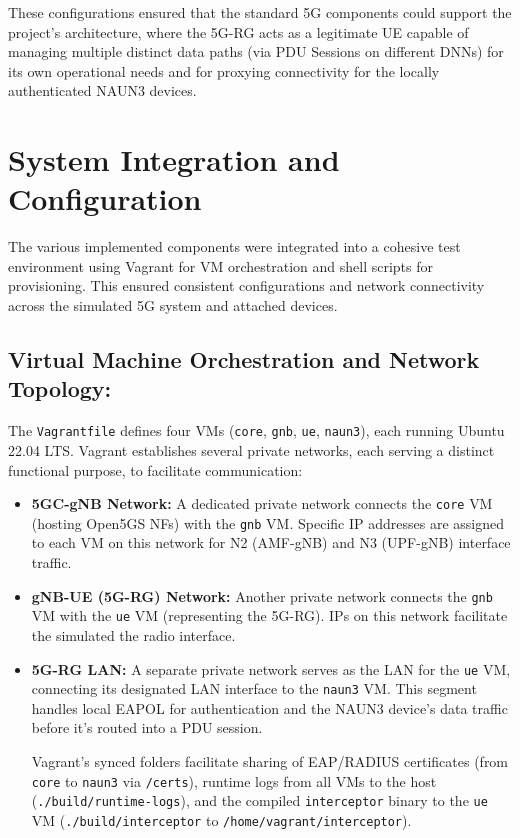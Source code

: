 These configurations ensured that the standard \ac{5G} components could support the project's architecture, where the \ac{5G-RG} acts as a legitimate \ac{UE} capable of managing multiple distinct data paths (via \ac{PDU} Sessions on different \acp{DNN}) for its own operational needs and for proxying connectivity for the locally authenticated \ac{NAUN3} devices.

\section{System Integration and Configuration}

The various implemented components were integrated into a cohesive test environment using Vagrant for \ac{VM} orchestration and shell scripts for provisioning. This ensured consistent configurations and network connectivity across the simulated \ac{5G} system and attached devices.

\subsection{Virtual Machine Orchestration and Network Topology:}

The \texttt{Vagrantfile} defines four \acp{VM} (\texttt{core}, \texttt{gnb}, \texttt{ue}, \texttt{naun3}), each running Ubuntu 22.04 LTS. Vagrant establishes several private networks, each serving a distinct functional purpose, to facilitate communication:

\begin{itemize}
    \item \textbf{\ac{5GC}-\ac{gNB} Network:} A dedicated private network connects the \texttt{core} \ac{VM} (hosting Open5GS \acp{NF}) with the \texttt{gnb} \ac{VM}. Specific \ac{IP} addresses are assigned to each \ac{VM} on this network for N2 (\ac{AMF}-\ac{gNB}) and N3 (\ac{UPF}-\ac{gNB}) interface traffic.

    \item \textbf{\ac{gNB}-\ac{UE} (\ac{5G}-\ac{RG}) Network:} Another private network connects the \texttt{gnb} \ac{VM} with the \texttt{ue} \ac{VM} (representing the \ac{5G-RG}). \acp{IP} on this network facilitate the simulated the radio interface.

    \item{ 
        \textbf{\ac{5G-RG} \ac{LAN}:} A separate private network serves as the \ac{LAN} for the \texttt{ue} \ac{VM}, connecting its designated \ac{LAN} interface to the \texttt{naun3} \ac{VM}. This segment handles local \ac{EAPOL} for authentication and the \ac{NAUN3} device's data traffic before it's routed into a \ac{PDU} session.
    
        Vagrant's synced folders facilitate sharing of \ac{EAP}/\ac{RADIUS} certificates (from \texttt{core} to \texttt{naun3} via \texttt{/certs}), runtime logs from all VMs to the host (\texttt{./build/runtime-logs}), and the compiled \texttt{interceptor} binary to the \texttt{ue} \ac{VM} (\texttt{./build/interceptor} to \texttt{/home/vagrant/interceptor}).
    }
\end{itemize}


